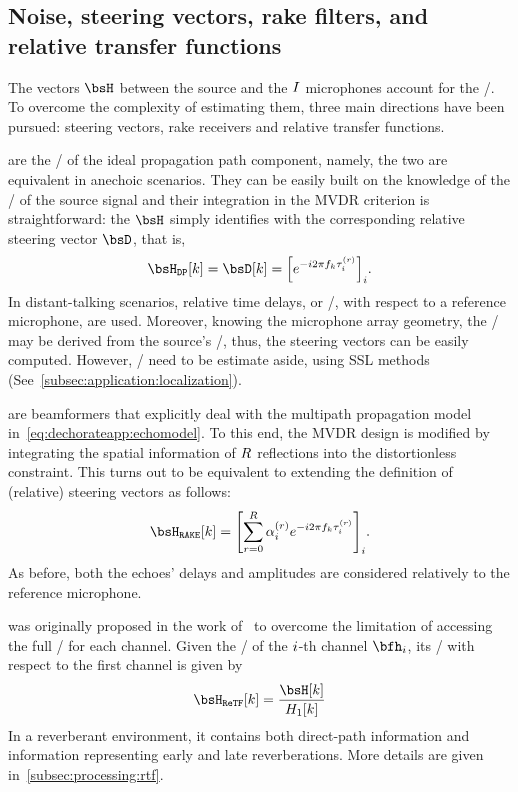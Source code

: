 \subsection{Noise, steering vectors, rake filters, and relative transfer functions}

The vectors $\FLTS$ between the source and the $I$ microphones account for the \RTFs/.
To overcome the complexity of estimating them, three main directions have been pursued: steering vectors, rake receivers and relative transfer functions.

 are the \RTFs/ of the ideal propagation path component, namely, the two are equivalent in anechoic scenarios.
They can be easily built on the knowledge of the \TOAs/ of the source signal and their integration in the \ac{MVDR} criterion is straightforward:
the $\FLTS$ simply identifies with the corresponding relative steering vector $\bsD$, that is,
\begin{equation}
    \FLTS_{\mathtt{DP}}[k] = \bsD[k] = \kbracket{ \cste^{-\csti 2 \pi f_k \tau_i^{(r)}} }_i
    .
\end{equation}
In distant-talking scenarios, relative time delays, or \TDOAs/, with respect to a reference microphone, are used.
Moreover, knowing the microphone array geometry, the \TDOAs/ may be derived from the source's \DOA/, thus, the steering vectors can be easily computed. However, \DOAs/ need to be estimate aside, using \acf{SSL} methods (See~\cref{subsec:application:localization}).

 are beamformers that explicitly deal with the multipath propagation model in~\cref{eq:dechorateapp:echomodel}.
To this end, the \ac{MVDR} design is modified by integrating the spatial information of $R$ reflections into the distortionless constraint.
This turns out to be equivalent to extending the definition of (relative) steering vectors as follows:
\begin{equation}
    \FLTS_{\mathtt{RAKE}}[k] = \kbracket{ \sum_{\idxEch=0}^{\numEchs} \alpha_{\idxMic}^{(r)} \cste^{-\csti 2 \pi f_k \tau_i^{(r)}} }_i
    .
\end{equation}
As before, both the echoes' delays and amplitudes are considered relatively to the reference microphone.

 was originally proposed in the work of~ to overcome the limitation of accessing the full \RTF/ for each channel.
Given the \RTF/ of the $i$-th channel $\bfh_\idxMic$, its \ReTF/ with respect to the first channel is given by
\begin{equation}
    \FLTS_{\mathtt{ReTF}}[k] = \frac{\FLTS[k]}{H_1[k]}
\end{equation}
In a reverberant environment, it contains both direct-path information and information representing early and late reverberations.
More details are given in~\cref{subsec:processing:rtf}.

